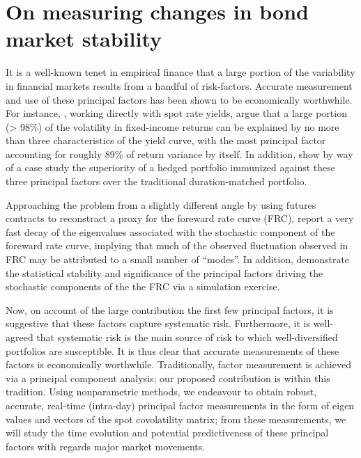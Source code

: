 \chapter{On measuring changes in  bond market stability}
It is a well-known tenet in empirical finance that a large portion of the variability in financial markets results from a handful of risk-factors. Accurate measurement and use of these principal factors has been shown to be economically worthwhile. For instance, \cite{Litterman1991}, working directly with spot rate yields, argue  that a large portion (> 98\%) of  the volatility in fixed-income returns  can be explained by no more than three  characteristics of the yield curve, with the most principal factor accounting for roughly 89\% of return variance by itself. In addition, \citeauthor{Litterman1991} show by way of a case study the superiority of a hedged portfolio immunized against these three principal factors  over the traditional duration-matched portfolio.  %



Approaching the problem from a slightly different angle by using futures contracts to reconstract a proxy for the foreward rate curve (FRC), \cite{Bouchaud1999} report a very fast decay of the eigenvalues associated with the stochastic component of the foreward rate curve, implying  that much of the observed fluctuation observed in  FRC may  be attributed to a  small number of ``modes''. In addition, \citeauthor{Bouchaud1999} demonstrate the statistical  stability and significance of the principal factors driving the stochastic components of the the FRC via a simulation exercise.   


Now, on account of the large contribution the first few principal factors, it is suggestive that these factors capture systematic risk. Furthermore, it is well-agreed that systematic risk is the main source of risk to which well-diversified portfolios are susceptible. It is thus clear that accurate measurements of these factors is economically worthwhile. Traditionally, factor measurement is achieved via a principal component analysis; our proposed contribution is within this tradition.  Using nonparametric methods, we endeavour to obtain robust, accurate, real-time (intra-day) principal factor measurements in the form of eigen values and vectors of the spot covolatility matrix; from these measurements, we will study the time evolution and potential predictiveness of these principal factors with regards major market movements.      
